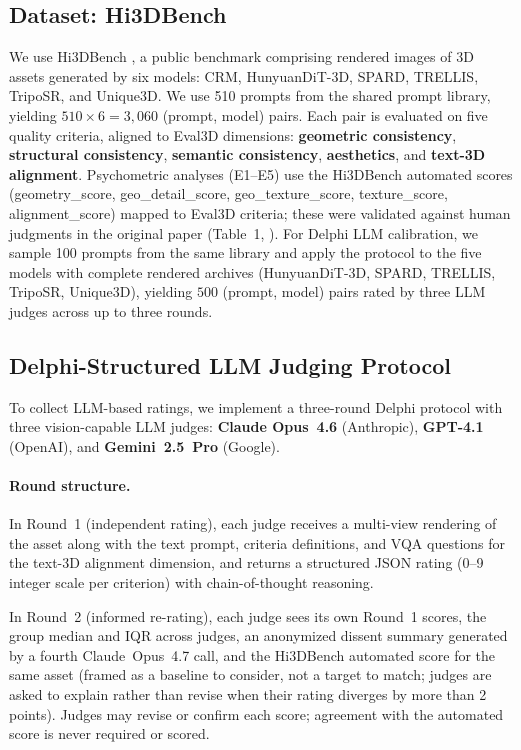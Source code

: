 \documentclass[10pt]{article}
\begin{document}
\subsection{Dataset: Hi3DBench}
We use Hi3DBench \citep{hi3deval2025}, a public benchmark comprising rendered
images of 3D assets generated by six models: CRM, HunyuanDiT-3D, SPARD,
TRELLIS, TripoSR, and Unique3D.
We use 510 prompts from the shared prompt library, yielding $510 \times 6 = 3{,}060$
(prompt, model) pairs.
Each pair is evaluated on five quality criteria, aligned to Eval3D dimensions:
\textbf{geometric consistency}, \textbf{structural consistency},
\textbf{semantic consistency}, \textbf{aesthetics}, and
\textbf{text-3D alignment}.
Psychometric analyses (E1--E5) use the Hi3DBench automated scores
(geometry\_score, geo\_detail\_score, geo\_texture\_score, texture\_score,
alignment\_score) mapped to Eval3D criteria; these were validated against
human judgments in the original paper (Table~1, \citealt{hi3deval2025}).
For Delphi LLM calibration, we sample 100 prompts from the same library and
apply the protocol to the five models with complete rendered archives
(HunyuanDiT-3D, SPARD, TRELLIS, TripoSR, Unique3D), yielding $500$
(prompt, model) pairs rated by three LLM judges across up to three rounds.

\subsection{Delphi-Structured LLM Judging Protocol}
\label{sec:delphi}

To collect LLM-based ratings, we implement a three-round Delphi protocol
with three vision-capable LLM judges: \textbf{Claude Opus~4.6}
(Anthropic), \textbf{GPT-4.1} (OpenAI), and \textbf{Gemini~2.5~Pro} (Google).

\paragraph{Round structure.}
In Round~1 (independent rating), each judge receives a multi-view rendering
of the asset along with the text prompt, criteria definitions, and
VQA questions for the text-3D alignment dimension, and returns a structured
JSON rating (0–9 integer scale per criterion) with chain-of-thought reasoning.

In Round~2 (informed re-rating), each judge sees its own Round~1 scores, the
group median and IQR across judges, an anonymized dissent summary
generated by a fourth Claude~Opus~4.7 call, and the Hi3DBench automated
score for the same asset (framed as a baseline to consider, not a target
to match; judges are asked to explain rather than revise when their rating
diverges by more than 2 points).
Judges may revise or confirm each score; agreement with the automated score
is never required or scored.
\end{document}

